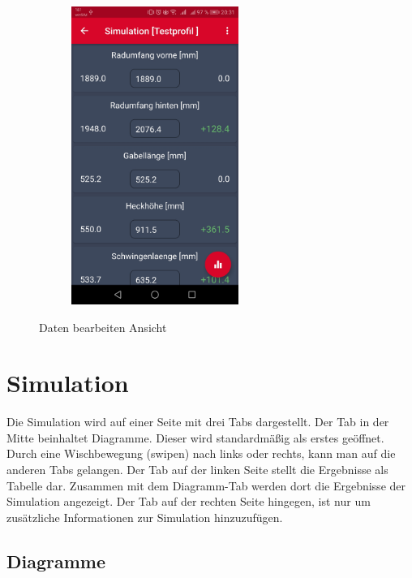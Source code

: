 \begin{figure}[H]
\begin{subfigure}[b]{0.5\textwidth}
		\includegraphics[width=0.6\textwidth]{../include/images/funktionalitaet/dataBearbeitenInput}
	\end{subfigure}		
	
	\caption{Daten bearbeiten Ansicht}
\end{figure}
	
	
	\section{Simulation}
	\label{sec:sim}
	
	Die Simulation wird auf einer Seite mit drei Tabs dargestellt.  Der Tab in der Mitte beinhaltet Diagramme. Dieser wird standardmäßig als erstes geöffnet. Durch eine Wischbewegung (swipen) nach links oder rechts, kann man auf die anderen Tabs gelangen. Der Tab auf der linken Seite stellt die Ergebnisse als Tabelle dar. Zusammen mit dem Diagramm-Tab werden dort die Ergebnisse der Simulation angezeigt. Der Tab auf der rechten Seite hingegen, ist nur um zusätzliche Informationen zur Simulation hinzuzufügen.
	
		\subsection{Diagramme}
		\label{subsec:diagr}
		
